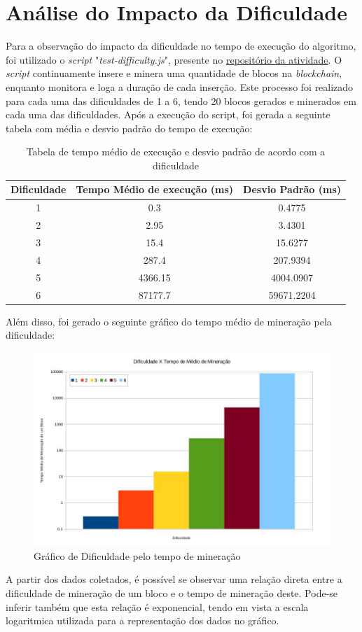 \documentclass{article}
\begin{document}
\section{Análise do Impacto da Dificuldade}
Para a observação do impacto da dificuldade no tempo de execução do algoritmo, foi utilizado o \textit{script} "\textit{test-difficulty.js}", presente no \href{https://github.com/caioasmuniz/local-blockchain}{repositório da atividade}. O \textit{script} continuamente insere e minera uma quantidade de blocos na \textit{blockchain}, enquanto monitora e loga a duração de cada inserção. Este processo foi realizado para cada uma das dificuldades de 1 a 6, tendo 20 blocos gerados e minerados em cada uma das dificuldades. Após a execução do script, foi gerada a seguinte tabela com média e desvio padrão do tempo de execução:
\begin{table}[h]
  \begin{tabular}{| c | c | c |}
    \hline
    Dificuldade & Tempo Médio de execução (ms) & Desvio Padrão (ms) \\
    \hline
    1           & 0.3                          & 0.4775             \\
    \hline
    2           & 2.95                         & 3.4301             \\
    \hline
    3           & 15.4                         & 15.6277            \\
    \hline
    4           & 287.4                        & 207.9394           \\
    \hline
    5           & 4366.15                      & 4004.0907          \\
    \hline
    6           & 87177.7                      & 59671.2204         \\
    \hline
  \end{tabular}
  \caption{Tabela de tempo médio de execução e desvio padrão de acordo com a dificuldade}
\end{table}

Além disso, foi gerado o seguinte gráfico do tempo médio de mineração pela dificuldade:
\begin{figure}[h!]
  \includegraphics[width=\textwidth]{difficulty-graph.jpg}
\caption{Gráfico de Dificuldade pelo tempo de mineração}
\end{figure}

A partir dos dados coletados, é possível se observar uma relação direta entre a dificuldade de mineração de um bloco e o tempo de mineração deste. Pode-se inferir também que esta relação é exponencial, tendo em vista a escala logaritmica utilizada para a representação dos dados no gráfico.
\end{document}
